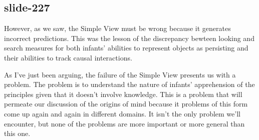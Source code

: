 \documentclass[12pt,\papersize]{extarticle}
\begin{document}
\subsection{slide-227}
However, as we saw, the Simple View must be wrong because it generates incorrect predictions.
This was the lesson of the discrepancy bewteen looking and search measures for both 
infants' abilities to represent objects as persisting and their abilities to track causal 
interactions.
 
As I've just been arguing, the failure of the Simple View presents us with a problem.
The problem is to understand the nature of infants' apprehension of the principles given
that it doesn't involve knowledge.
This is a problem that will permeate our discussion of the origins of mind because it 
problems of this form come up again and again in different domains. 
It isn't the only problem we'll encounter, but none of the problems are more important or more
general than this one.
 
 






\end{document}
